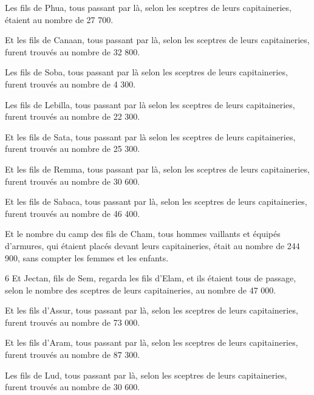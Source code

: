 \par Les fils de Phua, tous passant par là, selon les sceptres de leurs capitaineries, étaient au nombre de 27 700.

\par Et les fils de Canaan, tous passant par là, selon les sceptres de leurs capitaineries, furent trouvés au nombre de 32 800.

\par Les fils de Soba, tous passant par là selon les sceptres de leurs capitaineries, furent trouvés au nombre de 4 300.

\par Les fils de Lebilla, tous passant par là selon les sceptres de leurs capitaineries, furent trouvés au nombre de 22 300.

\par Et les fils de Sata, tous passant par là selon les sceptres de leurs capitaineries, furent trouvés au nombre de 25 300.

\par Et les fils de Remma, tous passant par là, selon les sceptres de leurs capitaineries, furent trouvés au nombre de 30 600.

\par Et les fils de Sabaca, tous passant par là, selon les sceptres de leurs capitaineries, furent trouvés au nombre de 46 400.

\par Et le nombre du camp des fils de Cham, tous hommes vaillants et équipés d'armures, qui étaient placés devant leurs capitaineries, était au nombre de 244 900, sans compter les femmes et les enfants.

\par 6 Et Jectan, fils de Sem, regarda les fils d'Elam, et ils étaient tous de passage, selon le nombre des sceptres de leurs capitaineries, au nombre de 47 000.

\par Et les fils d'Assur, tous passant par là, selon les sceptres de leurs capitaineries, furent trouvés au nombre de 73 000.

\par Et les fils d'Aram, tous passant par là, selon les sceptres de leurs capitaineries, furent trouvés au nombre de 87 300.

\par Les fils de Lud, tous passant par là, selon les sceptres de leurs capitaineries, furent trouvés au nombre de 30 600.

\par [Le nombre des fils de Cham était de 73 000.]

